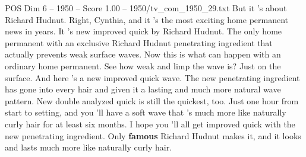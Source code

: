 \begin{textsample}{POS Dim 6 – 1950 – Score 1.00 – 1950/tv\_com\_1950\_29.txt}  \label{ex:f6_pos_020}
But it 's about Richard Hudnut.
Right, Cynthia, and it 's the most exciting home permanent news in years.
It 's new improved quick by Richard Hudnut.
The only home permanent with an exclusive Richard Hudnut penetrating ingredient that actually prevents weak surface waves.
Now this is what can happen with an ordinary home permanent.
See how weak and limp the wave is?
Just on the surface.
And here 's a new improved quick wave.
The new penetrating ingredient has gone into every hair and given it a lasting and much more natural wave pattern.
New double analyzed quick is still the quickest, too.
Just one hour from start to setting, and you 'll have a soft wave that 's much more like naturally curly hair for at least six months.
I hope you 'll all get improved quick with the new penetrating ingredient.
Only \textbf{famous} Richard Hudnut makes it, and it looks and lasts much more like naturally curly hair.

\end{textsample}
